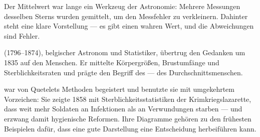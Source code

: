 \begin{geschichte}
Der Mittelwert war lange ein Werkzeug der Astronomie: Mehrere Messungen desselben Sterns wurden gemittelt, um den Messfehler zu verkleinern. Dahinter steht eine klare Vorstellung --- es gibt einen wahren Wert, und die Abweichungen sind Fehler.

 (1796--1874), belgischer Astronom und Statistiker, übertrug den Gedanken um 1835 auf den Menschen. Er mittelte Körpergrößen, Brustumfänge und Sterblichkeitsraten und prägte den Begriff des  --- des Durchschnittsmenschen.

\begin{center}
\begin{minipage}{0.9\textwidth}
\end{minipage}
\end{center}

 war von Quetelets Methoden begeistert und benutzte sie mit umgekehrtem Vorzeichen: Sie zeigte 1858 mit Sterblichkeitsstatistiken der Krimkriegslazarette, dass weit mehr Soldaten an Infektionen als an Verwundungen starben --- und erzwang damit hygienische Reformen. Ihre Diagramme gehören zu den frühesten Beispielen dafür, dass eine gute Darstellung eine Entscheidung herbeiführen kann.
\end{geschichte}

